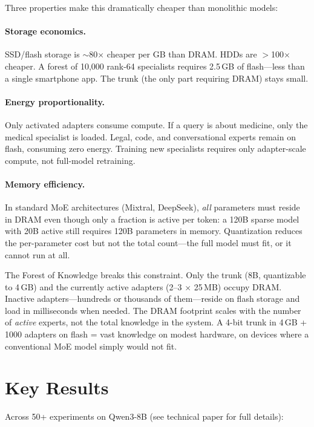 \documentclass[11pt]{article}
\begin{document}
Three properties make this dramatically cheaper than monolithic models:

\paragraph{Storage economics.}
SSD/flash storage is $\sim$80$\times$ cheaper per GB than DRAM. HDDs are
$>$100$\times$ cheaper. A forest of 10,000 rank-64 specialists requires
2.5\,GB of flash---less than a single smartphone app. The trunk (the only
part requiring DRAM) stays small.

\paragraph{Energy proportionality.}
Only activated adapters consume compute. If a query is about medicine, only
the medical specialist is loaded. Legal, code, and conversational experts
remain on flash, consuming zero energy. Training new specialists requires
only adapter-scale compute, not full-model retraining.

\paragraph{Memory efficiency.}
In standard MoE architectures (Mixtral, DeepSeek), \emph{all} parameters must
reside in DRAM even though only a fraction is active per token: a 120B sparse
model with 20B active still requires 120B parameters in memory. Quantization
reduces the per-parameter cost but not the total count---the full model must
fit, or it cannot run at all.

The Forest of Knowledge breaks this constraint. Only the trunk (8B, quantizable
to 4\,GB) and the currently active adapters (2--3 $\times$ 25\,MB) occupy DRAM.
Inactive adapters---hundreds or thousands of them---reside on flash storage and
load in milliseconds when needed. The DRAM footprint scales with the number of
\emph{active} experts, not the total knowledge in the system. A 4-bit trunk in
4\,GB + 1000 adapters on flash = vast knowledge on modest hardware, on devices
where a conventional MoE model simply would not fit.

\section{Key Results}

Across 50+ experiments on Qwen3-8B (see technical paper for full details):
\end{document}
